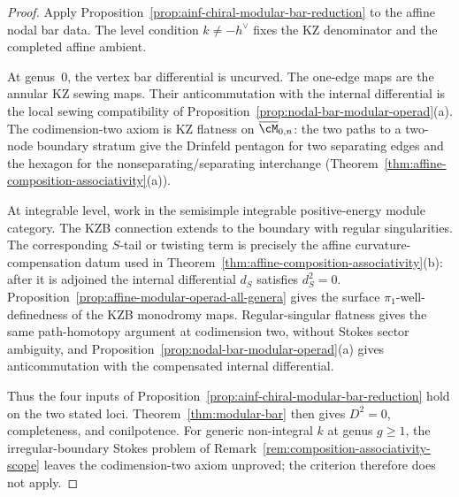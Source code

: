 \begin{proof}
Apply Proposition~\ref{prop:ainf-chiral-modular-bar-reduction} to the
affine nodal bar data.  The level condition \(k\ne-h^\vee\) fixes the
KZ denominator and the completed affine ambient.

At genus~\(0\), the vertex bar differential is uncurved.  The
one-edge maps are the annular KZ sewing maps.  Their anticommutation
with the internal differential is the local sewing compatibility of
Proposition~\ref{prop:nodal-bar-modular-operad}(a).  The
codimension-two axiom is KZ flatness on
\(\overline{\cM}_{0,n}\): the two paths to a two-node boundary stratum
give the Drinfeld pentagon for two separating edges and the hexagon
for the nonseparating/separating interchange
\textup{(}Theorem~\ref{thm:affine-composition-associativity}(a)\textup{)}.

At integrable level, work in the semisimple integrable
positive-energy module category.  The KZB connection extends to the
boundary with regular singularities.  The corresponding \(S\)-tail
or twisting term is precisely the affine curvature-compensation datum
used in Theorem~\ref{thm:affine-composition-associativity}(b): after
it is adjoined the internal differential \(d_S\) satisfies
\(d_S^2=0\).  Proposition~\ref{prop:affine-modular-operad-all-genera}
gives the surface \(\pi_1\)-well-definedness of the KZB monodromy
maps.  Regular-singular flatness gives the same path-homotopy
argument at codimension two, without Stokes sector ambiguity, and
Proposition~\ref{prop:nodal-bar-modular-operad}(a) gives
anticommutation with the compensated internal differential.

Thus the four inputs of
Proposition~\ref{prop:ainf-chiral-modular-bar-reduction} hold on
the two stated loci.  Theorem~\ref{thm:modular-bar} then gives
\(D^2=0\), completeness, and conilpotence.  For generic
non-integral \(k\) at genus \(g\ge1\), the irregular-boundary Stokes
problem of Remark~\ref{rem:composition-associativity-scope} leaves
the codimension-two axiom unproved; the criterion therefore does not
apply.
\end{proof}

